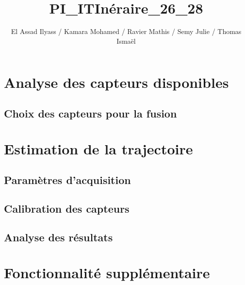 

\usepackage[utf8]{inputenc}
\usepackage[T1]{fontenc}
\usepackage[french]{babel}
\usepackage{graphicx}
\usepackage{svg}
\usepackage{url}
\usepackage{float}
\usepackage[
  left=2cm,
  right=2cm,
  top=2.5cm,
  bottom=2.5cm
]{geometry}
\usepackage{amsmath}
\usepackage[colorlinks=true, allcolors=blue]{hyperref}

\title{PI\_ITInéraire\_26\_28}
\author{El Assad Ilyass / Kamara Mohamed / Ravier Mathis / Semy Julie / Thomas Ismaël}


\maketitle
\tableofcontents

\newpage
\section{Analyse des capteurs disponibles}

\subsection{Choix des capteurs pour la fusion}


\section{Estimation de la trajectoire}

\subsection{Paramètres d'acquisition}
\label{sec:params}



\subsection{Calibration des capteurs}
 




\subsection{Analyse des résultats}


\section{Fonctionnalité supplémentaire}


